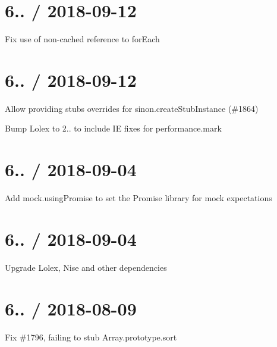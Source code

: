 \section*{6.. / 2018-\/09-\/12 }


\begin{DoxyItemize}
\item Fix use of non-\/cached reference to for\+Each
\end{DoxyItemize}

\section*{6.. / 2018-\/09-\/12 }


\begin{DoxyItemize}
\item Allow providing stubs overrides for sinon.\+create\+Stub\+Instance (\#1864)
\item Bump Lolex to 2.. to include IE fixes for performance.\+mark
\end{DoxyItemize}

\section*{6.. / 2018-\/09-\/04 }


\begin{DoxyItemize}
\item Add mock.\+using\+Promise to set the Promise library for mock expectations
\end{DoxyItemize}

\section*{6.. / 2018-\/09-\/04 }


\begin{DoxyItemize}
\item Upgrade Lolex, Nise and other dependencies
\end{DoxyItemize}

\section*{6.. / 2018-\/08-\/09 }


\begin{DoxyItemize}
\item Fix \#1796, failing to stub Array.\+prototype.\+sort
\end{DoxyItemize}


